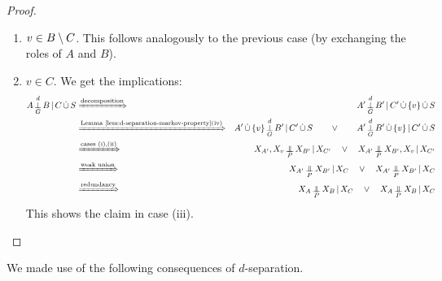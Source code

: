 \begin{proof}
\begin{enumerate}[label=(\roman*)]
    From redundancy we get the implications:
    \begin{align*}
      &&X_{A\sm C} \Indep_{P} X_B \given X_{A'},X_v,X_C\\
    & \xRightarrow{\text{contraction} \eqref{eqn:bloop}}  &  
      X_{A'},X_v,X_{A\sm C} \Indep_{P}  X_B \given X_C\\
    & \xRightarrow{\text{decomposition}}  &    
    X_A \Indep_{P}  X_B \given X_C. 
    \end{align*}
    This shows the claim in the first case.

  \item $v \in B\setminus C$. This follows analogously to the previous case (by exchanging the roles of $A$ and $B$).

  \item $v \in C$.
    We get the implications:
    \begin{align*}
    A  \Perp^d_G B \given C \dcup S
      & \xRightarrow{\text{decomposition}}  & A' \Perp^d_G  B' \given C'\dcup\{v\} \dcup S \\
      & \xRightarrow{\text{Lemma~\ref{lem:d-separation-markov-property}(iv)}} &  A' \dcup \{v\} \Perp^d_G  B' \given C' \dcup S \qquad \lor \qquad A' \Perp^d_G B' \dcup \{v\} \given C' \dcup S \\
      & \xRightarrow{\text{cases (i),(ii)}} &  X_{A'},X_v \Indep_{P}  X_{B'} \given X_{C'} \quad \lor \quad X_{A'} \Indep_{P}  X_{B'},X_v \given X_{C'} \\
      & \xRightarrow{\text{weak union}} &  X_{A'} \Indep_{P}  X_{B'} \given X_{C} \quad \lor \quad X_{A'} \Indep_{P}  X_{B'} \given X_{C} \\
      & \xRightarrow{\text{redundancy}} &  X_A \Indep_{P}  X_B \given X_{C} \quad \lor \quad X_A \Indep_{P}  X_B \given X_{C}
    \end{align*}
    This shows the claim in case (iii).
\end{enumerate}
\end{proof}
We made use of the following consequences of $d$-separation.
